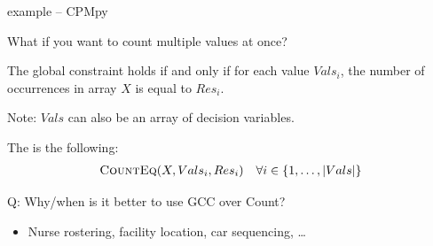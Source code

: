 \documentclass{cons-beamer}
\begin{document}
\begin{flashcardcpmpy}
	\begin{frame}{ example -- CPMpy}
		\begin{example}
			\vspace{-3mm}
			
			\vspace{-3mm}
		\end{example}  
	\end{frame}
\end{flashcardcpmpy}

\begin{frame}{}
  What if you want to count multiple values at once?
	
  \begin{definition}[R\'{e}gin, 1996]
  	The  global constraint holds if and only if for each value $Vals_i$, the number of occurrences in array $X$ is equal to $Res_i$.
  \end{definition}
  \vfill
  
  Note: $Vals$ can also be an array of decision variables.
  \vfill
  
  The  is the following:
  \begin{align*}
  	&\textsc{CountEq}(X, Vals_i, Res_i) & \forall i \in \{1, \ldots, |Vals|\}
  \end{align*}
  \vfill
  
  Q: Why/when is it better to use GCC over Count?
  \pause
  
  \begin{examples}
  \begin{itemize}
  	\item Nurse rostering, facility location, car sequencing, \dots
  \end{itemize}
  \end{examples}
\end{frame}
\end{document}
